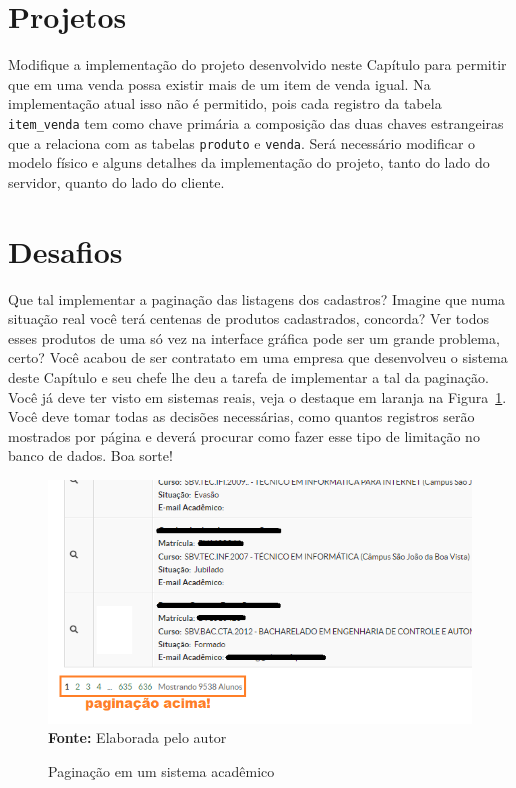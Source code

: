 \section{Projetos}

\begin{projetoSemArquivo}{}{}{}
    Modifique a implementação do projeto desenvolvido neste Capítulo para permitir que em uma venda possa existir mais de um item de venda igual. Na implementação atual isso não é permitido, pois cada registro da tabela \texttt{item\_venda} tem como chave primária a composição das duas chaves estrangeiras que a relaciona com as tabelas \texttt{produto} e \texttt{venda}. Será necessário modificar o modelo físico e alguns detalhes da implementação do projeto, tanto do lado do servidor, quanto do lado do cliente.
\end{projetoSemArquivo}


\section{Desafios}

\begin{desafioSemArquivo}{}{}{}
    Que tal implementar a paginação das listagens dos cadastros? Imagine que numa situação real você terá centenas de produtos cadastrados, concorda? Ver todos esses produtos de uma só vez na interface gráfica pode ser um grande problema, certo? Você acabou de ser contratato em uma empresa que desenvolveu o sistema deste Capítulo e seu chefe lhe deu a tarefa de implementar a tal da paginação. Você já deve ter visto em sistemas reais, veja o destaque em laranja na Figura~\ref{fig:cap08DesafioPaginacao}. Você deve tomar todas as decisões necessárias, como quantos registros serão mostrados por página e deverá procurar como fazer esse tipo de limitação no banco de dados. Boa sorte!
    
    \FloatBarrier
    \begin{figure}[!htbp]
        \centering
        \caption{Paginação em um sistema acadêmico}
        \includegraphics[scale=0.8]{imagens/cap08DesafioPaginacao}
        \\\textbf{Fonte:} Elaborada pelo autor
        \label{fig:cap08DesafioPaginacao}
    \end{figure}
    \FloatBarrier
\end{desafioSemArquivo}

